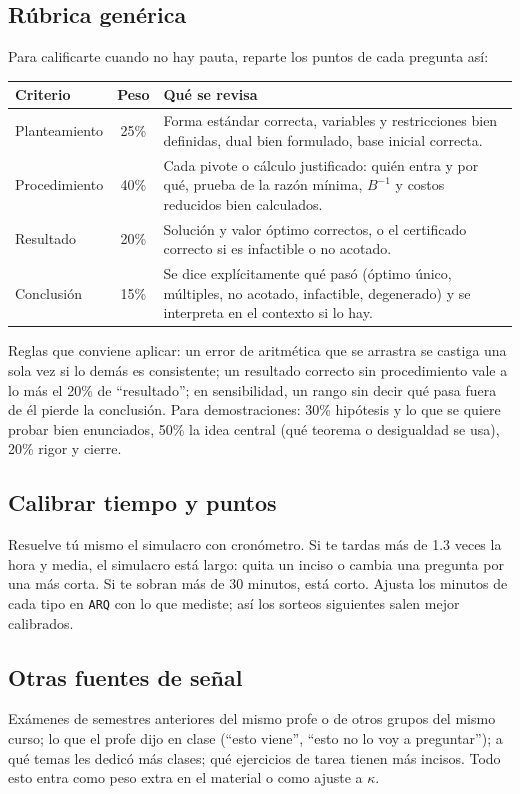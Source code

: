\documentclass[11pt]{article}
\newcommand{\cod}[1]{\texttt{#1}}
\begin{document}
\subsection{Rúbrica genérica}
Para calificarte cuando no hay pauta, reparte los puntos de cada pregunta así:

\begin{center}
\small
\begin{tabularx}{\textwidth}{lcX}
\toprule
Criterio & Peso & Qué se revisa \\
\midrule
Planteamiento & 25\% & Forma estándar correcta, variables y restricciones bien definidas,
dual bien formulado, base inicial correcta. \\
Procedimiento & 40\% & Cada pivote o cálculo justificado: quién entra y por qué, prueba de
la razón mínima, $B^{-1}$ y costos reducidos bien calculados. \\
Resultado & 20\% & Solución y valor óptimo correctos, o el certificado correcto si es
infactible o no acotado. \\
Conclusión & 15\% & Se dice explícitamente qué pasó (óptimo único, múltiples, no acotado,
infactible, degenerado) y se interpreta en el contexto si lo hay. \\
\bottomrule
\end{tabularx}
\end{center}

Reglas que conviene aplicar: un error de aritmética que se arrastra se castiga una sola vez si
lo demás es consistente; un resultado correcto sin procedimiento vale a lo más el 20\% de
``resultado''; en sensibilidad, un rango sin decir qué pasa fuera de él pierde la conclusión.
Para demostraciones: 30\% hipótesis y lo que se quiere probar bien enunciados, 50\% la idea
central (qué teorema o desigualdad se usa), 20\% rigor y cierre.

\subsection{Calibrar tiempo y puntos}
Resuelve tú mismo el simulacro con cronómetro. Si te tardas más de 1.3 veces la hora y media,
el simulacro está largo: quita un inciso o cambia una pregunta por una más corta. Si te sobran
más de 30 minutos, está corto. Ajusta los minutos de cada tipo en \cod{ARQ} con lo que
mediste; así los sorteos siguientes salen mejor calibrados.

\subsection{Otras fuentes de señal}
Exámenes de semestres anteriores del mismo profe o de otros grupos del mismo curso; lo que el
profe dijo en clase (``esto viene'', ``esto no lo voy a preguntar''); a qué temas les dedicó
más clases; qué ejercicios de tarea tienen más incisos. Todo esto entra como peso extra en el
material o como ajuste a $\kappa$.
\end{document}
